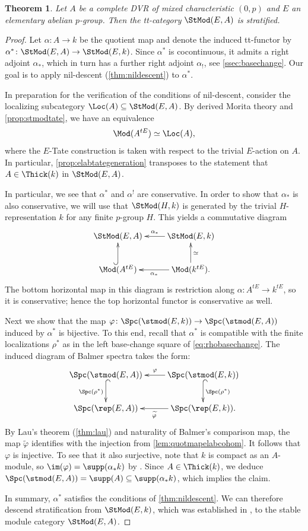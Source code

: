 \documentclass{amsart}%
\numberwithin{equation}{section}%
\newtheorem{Thm}[equation]{Theorem}
\theoremstyle{remark}
\begin{document}
\begin{Thm}\label{thm:elabstmodstratification}
Let $A$ be a complete DVR of mixed characteristic $(0,p)$ and $E$ an elementary abelian $p$-group. Then the tt-category $\StMod(E,A)$ is stratified.
\end{Thm}
\begin{proof}
Let $\alpha\colon A \to k$ be the quotient map and denote the induced tt-functor by $\alpha^*\colon \StMod(E,A) \to \StMod(E,k)$. Since $\alpha^*$ is cocontinuous, it admits a right adjoint $\alpha_*$, which in turn has a further right adjoint $\alpha_!$, see \cref{ssec:basechange}. Our goal is to apply nil-descent (\cref{thm:nildescent}) to $\alpha^*$. 

In preparation for the verification of the conditions of nil-descent, consider the localizing subcategory $\Loc(A) \subseteq \StMod(E,A)$. By derived Morita theory and \cref{prop:stmodtate}, we have an equivalence 
\[
\Mod(A^{tE}) \simeq \Loc(A),
\]
where the $E$-Tate construction is taken with respect to the trivial $E$-action on $A$. In particular, \cref{prop:elabtategeneration} transposes to the statement that $A \in \Thick(k)$ in $\StMod(E,A)$.

In particular, we see that $\alpha^*$ and $\alpha^!$ are conservative. In order to show that $\alpha_*$ is also conservative, we will use that $\StMod(H,k)$ is generated by the trivial $H$-representation $k$ for any finite $p$-group $H$. This yields a commutative diagram
\[
\xymatrix{\StMod(E,A) & \StMod(E,k) \ar[l]_-{\alpha_*}\\
\Mod(A^{tE}) \ar@{^{(}->}[u] & \Mod(k^{tE}) \ar[u]_{\simeq} \ar[l]^-{\alpha_*}.}
\]
The bottom horizontal map in this diagram is restriction along $\alpha\colon A^{tE}\to k^{tE}$, so it is conservative; hence the top horizontal functor is conservative as well. 

Next we show that the map $\varphi\colon \Spc(\stmod(E,k)) \to \Spc(\stmod(E,A))$ induced by $\alpha^*$ is bijective. To this end, recall that $\alpha^*$ is compatible with the finite localizations $\rho^*$ as in the left base-change square of \eqref{eq:rhobasechange}. The induced diagram of Balmer spectra takes the form:
\[
\xymatrix{\Spc(\stmod(E,A)) \ar@{^{(}->}[d]_{\Spc(\rho^*)} & \Spc(\stmod(E,k)) \ar@{^{(}->}[d]^{\Spc(\rho^*)} \ar[l]_-{\varphi} \\
\Spc(\rep(E,A))  & \Spc(\rep(E,k)). \ar[l]^-{\widetilde{\varphi}}}
\]
By Lau's theorem (\cref{thm:lau}) and naturality of Balmer's comparison map, the map $\widetilde{\varphi}$ identifies with the injection from \cref{lem:quotmapelabcohom}. It follows that $\varphi$ is injective. To see that it also surjective, note that $k$ is compact as an $A$-module, so $\im(\varphi) = \supp(\alpha_*k)$ by \cite[Thm.~1.7]{Balmer18}. Since $A \in \Thick(k)$, we deduce $\Spc(\stmod(E,A)) = \supp(A) \subseteq \supp(\alpha_*k)$, which implies the claim. 

In summary, $\alpha^*$ satisfies the conditions of \cref{thm:nildescent}. We can therefore descend stratification from $\StMod(E,k)$, which was established in \cite{BensonIyengarKrause11a}, to the stable module category $\StMod(E,A)$.
\end{proof}
\end{document}
